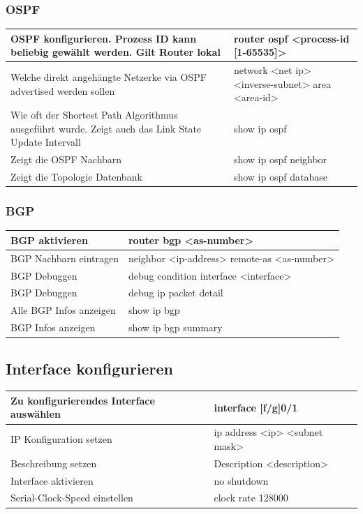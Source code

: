 \subsubsection{OSPF}
\begin{tabu} to \linewidth {|X|X|}
	\hline
	OSPF konfigurieren. Prozess ID kann beliebig gewählt werden. Gilt Router lokal & router ospf <process-id [1-65535]>\\ 
	\hline
	Welche direkt angehängte Netzerke via OSPF advertised werden sollen & network <net ip> <inverse-subnet> area <area-id> \\ 
	\hline
	Wie oft der Shortest Path Algorithmus ausgeführt wurde. Zeigt auch das Link State Update Intervall & show ip ospf \\ 
	\hline
	Zeigt die OSPF Nachbarn & show ip ospf neighbor\\ 
	\hline
	Zeigt die Topologie Datenbank & show ip ospf database \\ 
	\hline
\end{tabu}

\subsubsection{BGP}
\begin{tabu} to \linewidth {|X|X|}
	\hline
	BGP aktivieren & router bgp <as-number> \\ 
	\hline
	BGP Nachbarn eintragen & neighbor <ip-address> remote-as <as-number> \\ 
	\hline
	BGP Debuggen & debug condition interface <interface>\\
	\hline
	BGP Debuggen & debug ip packet detail\\ 
	\hline
	Alle BGP Infos anzeigen & show ip bgp\\ 
	\hline
	BGP Infos anzeigen & show ip bgp summary\\ 
	\hline
\end{tabu}

\subsection{Interface konfigurieren}
\begin{tabu} to \linewidth {|X|X|}
	\hline
	Zu konfigurierendes Interface auswählen & interface [f/g]0/1 \\ 
	\hline
	IP Konfiguration setzen & ip address <ip> <subnet mask>  \\ 
	\hline
	Beschreibung setzen & Description <description>  \\ 
	\hline
	Interface aktivieren & no shutdown  \\ 
	\hline
	Serial-Clock-Speed einstellen & clock rate 128000 \\
	\hline
\end{tabu}

